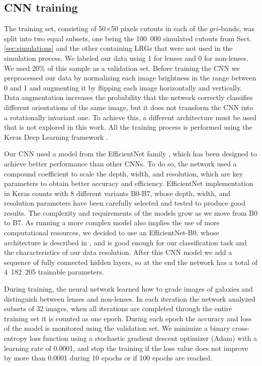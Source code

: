 \documentclass[tradiabstract,twocolumn]{aa}
\begin{document}
\subsection{CNN training}\label{subsec:training}

The training set, consisting of 50$\times$50 pixels cutouts in each of the $gri$-bands, was split into two equal subsets, one being the 100~000 simulated cutouts from Sect. \ref{sec:simulations} and the other containing LRGs that were not used in the simulation process. We labeled our data using 1 for lenses and 0 for non-lenses. We used 20$\%$ of this sample as a validation set. Before training the CNN we preprocessed our data by normalizing each image brightness in the range between 0 and 1 and augmenting it by flipping each image horizontally and vertically. Data augmentation increases the probability that the network correctly classifies different orientations of the same image, but it does not transform the CNN into a rotationally invariant one. To achieve this, a different architecture must be used that is not explored in this work. All the training process is performed using the Keras Deep Learning framework \citep{chollet2015keras}.

Our CNN used a model from the EfficientNet family \citep{tan2020efficientnet}, which has been designed to achieve better performance than other CNNs. To do so, the network used a compound coefficient to scale the depth, width, and resolution, which are key parameters to obtain better accuracy and efficiency. EfficientNet implementation in Keras counts with 8 different variants B0-B7, whose depth, width, and resolution parameters have been carefully selected and tested to produce good results. The complexity and requirements of the models grow as we move from B0 to B7. %
As running a more complex model also implies the use of more computational resources, we decided to use an EfficientNet-B0, whose architecture is described in \citep{tan2020efficientnet}, and is good enough for our classification task and the characteristics of our data resolution. After this CNN model we add a sequence of fully connected hidden layers, so at the end the network has a total of 4~182~205 trainable parameters. 

During training, the neural network learned how to grade images of galaxies and distinguish between lenses and non-lenses. In each iteration the network analyzed subsets of 32 images, when all iterations are completed through the entire training set it is counted as one epoch. During each epoch the accuracy and loss of the model is monitored using the validation set. We minimize a binary cross-entropy loss function using a stochastic gradient descent optimizer (Adam) with a learning rate of 0.0001, and stop the training if the loss value does not improve by more than 0.0001 during 10 epochs or if 100 epochs are reached.
\end{document}
